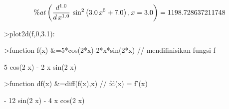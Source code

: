 \documentclass{article}
\begin{document}
\begin{eulernotebook}
\begin{eulercomment}
\begin{eulercomment}
\begin{eulercomment}
\begin{eulercomment}
\begin{eulercomment}
\begin{eulercomment}
\begin{eulerformula}
\end{eulerformula}
\begin{eulerformula}
\[
{\it \%at}\left(\frac{d^{1.0}}{d\,x^{1.0}}\,\sin ^2\left(3.0\,x^5+  7.0\right) , x=3.0\right)=1198.728637211748
\]
\end{eulerformula}
\begin{eulerprompt}
>plot2d(f,0,3.1):
\end{eulerprompt}
\begin{eulerprompt}
>function f(x) &=5*cos(2*x)-2*x*sin(2*x) // mendifinisikan fungsi f
\end{eulerprompt}
\begin{euleroutput}
  
                        5 cos(2 x) - 2 x sin(2 x)
  
\end{euleroutput}
\begin{eulerprompt}
>function df(x) &=diff(f(x),x) // fd(x) = f'(x)
\end{eulerprompt}
\begin{euleroutput}
  
                       - 12 sin(2 x) - 4 x cos(2 x)
  

\end{euleroutput}
\end{eulercomment}
\end{eulercomment}
\end{eulercomment}
\end{eulercomment}
\end{eulercomment}
\end{eulercomment}
\end{eulernotebook}
\end{document}
